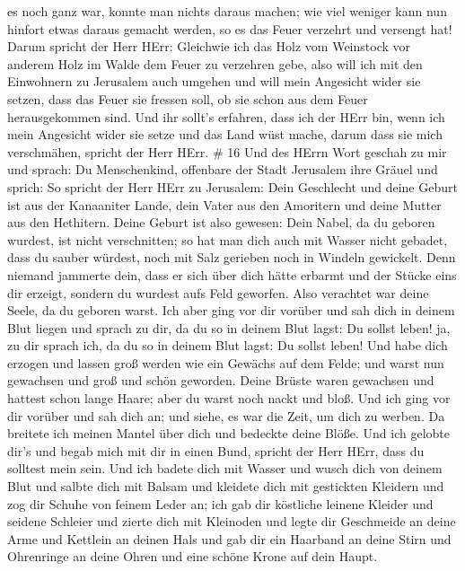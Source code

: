 es noch ganz war, konnte man nichts daraus machen; wie viel weniger kann
nun hinfort etwas daraus gemacht werden, so es das Feuer verzehrt und
versengt hat!  Darum spricht der Herr HErr: Gleichwie ich
das Holz vom Weinstock vor anderem Holz im Walde dem Feuer zu verzehren
gebe, also will ich mit den Einwohnern zu Jerusalem auch umgehen
 und will mein Angesicht wider sie setzen, dass das Feuer
sie fressen soll, ob sie schon aus dem Feuer herausgekommen sind. Und
ihr sollt's erfahren, dass ich der HErr bin, wenn ich mein Angesicht
wider sie setze  und das Land wüst mache, darum dass sie
mich verschmähen, spricht der Herr HErr. \# 16  Und des
HErrn Wort geschah zu mir und sprach:  Du Menschenkind,
offenbare der Stadt Jerusalem ihre Gräuel und sprich:  So
spricht der Herr HErr zu Jerusalem: Dein Geschlecht und deine Geburt ist
aus der Kanaaniter Lande, dein Vater aus den Amoritern und deine Mutter
aus den Hethitern.  Deine Geburt ist also gewesen: Dein
Nabel, da du geboren wurdest, ist nicht verschnitten; so hat man dich
auch mit Wasser nicht gebadet, dass du sauber würdest, noch mit Salz
gerieben noch in Windeln gewickelt.  Denn niemand jammerte
dein, dass er sich über dich hätte erbarmt und der Stücke eins dir
erzeigt, sondern du wurdest aufs Feld geworfen. Also verachtet war deine
Seele, da du geboren warst.  Ich aber ging vor dir vorüber
und sah dich in deinem Blut liegen und sprach zu dir, da du so in deinem
Blut lagst: Du sollst leben! ja, zu dir sprach ich, da du so in deinem
Blut lagst: Du sollst leben!  Und habe dich erzogen und
lassen groß werden wie ein Gewächs auf dem Felde; und warst nun
gewachsen und groß und schön geworden. Deine Brüste waren gewachsen und
hattest schon lange Haare; aber du warst noch nackt und bloß.
 Und ich ging vor dir vorüber und sah dich an; und siehe, es
war die Zeit, um dich zu werben. Da breitete ich meinen Mantel über dich
und bedeckte deine Blöße. Und ich gelobte dir's und begab mich mit dir
in einen Bund, spricht der Herr HErr, dass du solltest mein sein.
 Und ich badete dich mit Wasser und wusch dich von deinem
Blut und salbte dich mit Balsam  und kleidete dich mit
gestickten Kleidern und zog dir Schuhe von feinem Leder an; ich gab dir
köstliche leinene Kleider und seidene Schleier  und zierte
dich mit Kleinoden und legte dir Geschmeide an deine Arme und Kettlein
an deinen Hals  und gab dir ein Haarband an deine Stirn und
Ohrenringe an deine Ohren und eine schöne Krone auf dein Haupt.
